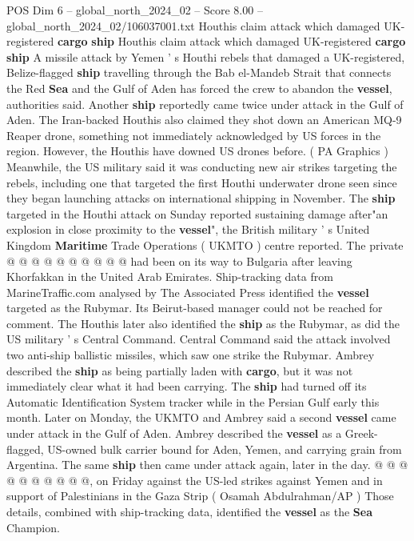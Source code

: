 \begin{textsample}{POS Dim 6 – global\_north\_2024\_02 – Score 8.00 – global\_north\_2024\_02/106037001.txt}  \label{ex:f6_pos_193}
Houthis claim attack which damaged UK-registered \textbf{cargo} \textbf{ship} Houthis claim attack which damaged UK-registered \textbf{cargo} \textbf{ship} A missile attack by Yemen ' s Houthi rebels that damaged a UK-registered, Belize-flagged \textbf{ship} travelling through the Bab el-Mandeb Strait that connects the Red \textbf{Sea} and the Gulf of Aden has forced the crew to abandon the \textbf{vessel}, authorities said.
Another \textbf{ship} reportedly came twice under attack in the Gulf of Aden.
The Iran-backed Houthis also claimed they shot down an American MQ-9 Reaper drone, something not immediately acknowledged by US forces in the region.
However, the Houthis have downed US drones before. ( PA Graphics ) Meanwhile, the US military said it was conducting new air strikes targeting the rebels, including one that targeted the first Houthi underwater drone seen since they began launching attacks on international shipping in November.
The \textbf{ship} targeted in the Houthi attack on Sunday reported sustaining damage after"an explosion in close proximity to the \textbf{vessel}", the British military ' s United Kingdom \textbf{Maritime} Trade Operations ( UKMTO ) centre reported.
The private @ @ @ @ @ @ @ @ @ @ had been on its way to Bulgaria after leaving Khorfakkan in the United Arab Emirates.
Ship-tracking data from MarineTraffic.com analysed by The Associated Press identified the \textbf{vessel} targeted as the Rubymar.
Its Beirut-based manager could not be reached for comment.
The Houthis later also identified the \textbf{ship} as the Rubymar, as did the US military ' s Central Command.
Central Command said the attack involved two anti-ship ballistic missiles, which saw one strike the Rubymar.
Ambrey described the \textbf{ship} as being partially laden with \textbf{cargo}, but it was not immediately clear what it had been carrying.
The \textbf{ship} had turned off its Automatic Identification System tracker while in the Persian Gulf early this month.
Later on Monday, the UKMTO and Ambrey said a second \textbf{vessel} came under attack in the Gulf of Aden.
Ambrey described the \textbf{vessel} as a Greek-flagged, US-owned bulk carrier bound for Aden, Yemen, and carrying grain from Argentina.
The same \textbf{ship} then came under attack again, later in the day. @ @ @ @ @ @ @ @ @ @, on Friday against the US-led strikes against Yemen and in support of Palestinians in the Gaza Strip ( Osamah Abdulrahman/AP ) Those details, combined with ship-tracking data, identified the \textbf{vessel} as the \textbf{Sea} Champion.

\end{textsample}
